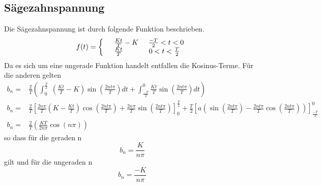\subsection{Sägezahnspannung}
\label{sec:Saegezahnspannung}
Die Sägezahnspannung ist durch folgende Funktion beschrieben.
\begin{equation*}
  f(t)=\left\{
  \begin{array}{l l}
    &\frac{Kt}{T}-K   \;\;\;\;\;\frac{-T}{2}<t<0 \\
    &\frac{Kt}{T}   \;\;\;\;\;\;\;\;\;\;\;\;\;0<t<\frac{T}{2}
  \end{array}
  \right.
\end{equation*}
Da es sich um eine ungerade Funktion handelt entfallen die Kosinus-Terme. Für die
anderen gelten
\begin{align*}
  b_n=&\frac{2}{T}\left(\int^{\frac{T}{2}}_0\;\left(\frac{Kt}{T}-K\right)
  \sin\left(\frac{2nt\pi}{T}\right)dt +\int^0_{\frac{-T}{2}}\frac{Kt}{T}
  \sin\left(\frac{2nt\pi}{T}\right)dt\right)\\
  b_n=&\frac{2}{T}\left[\frac{2n\pi}{T}\left(K-\frac{Kt}{T}\right)
  \cos\left(\frac{2nt\pi}{T}\right)+\frac{2n\pi}{T}\sin\left(\frac{2nt\pi}{T}\right)
  \right]^{\frac{T}{2}}_0+\frac{T}{2}\left[a\left(\sin\left(\frac{2nt\pi}{T}\right)
  -\frac{2nt\pi}{T}\cos\left(\frac{2nt\pi}{T}\right)\right)\right]^0_\frac{-T}{2}\\
  b_n=&\frac{2}{T}\left(\frac{KT}{2n\pi}\cos(n\pi)\right)
\end{align*}
so dass für die geraden n
\begin{equation}
  b_n=\frac{K}{n\pi}
\end{equation}
gilt und für die ungeraden n
\begin{equation}
  b_n=\frac{-K}{n\pi}
\end{equation}
